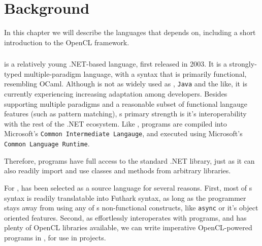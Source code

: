 \chapter{Background}
In this chapter we will describe the languages that \fshark{} depends on,
including a short introduction to the OpenCL framework.

\subsection*{\fsharp{}}
\fsharp{} is a relatively young .NET-based language, first released in 2003.
It is a strongly-typed multiple-paradigm language, with a syntax that is
primarily functional, resembling OCaml.
Although \fsharp{} is not as widely used as \csharp{}, \texttt{Java} and the
like, it is currently experiencing increasing adaptation among
developers\cite{citeme}.
Besides supporting multiple paradigms and a reasonable subset of functional
langauge features (such as pattern matching), \fsharp{}s primary strength is
it's interoperability with the rest of the .NET ecosystem. Like \csharp{},
\fsharp{} programs are compiled into Microsoft's \texttt{Common Intermediate
  Langauge}, and executed using Microsoft's \texttt{Common Language Runtime}.

Therefore, \fsharp{} programs have full access to the standard .NET library,
just as it can also readily import and use classes and methods from arbitrary
\csharp{} libraries.

For \fshark{}, \fsharp{} has been selected as a source language for several
reasons.
First, most of \fsharp{}s syntax is readily translatable into Futhark syntax, as
long as the programmer stays away from using any of \fsharp{}s non-functional
constructs, like \texttt{async} or it's object oriented features.
Second, as \fsharp{} effortlessly interoperates with \csharp{} programs, and
\csharp{} has plenty of OpenCL libraries available, we can write imperative
OpenCL-powered programs in \csharp{}, for use in \fsharp{} projects.


\section*{\csharp{}}
\csharp{} 
\csharp{} 
\csharp{} 
\csharp{} 

\clearpage
